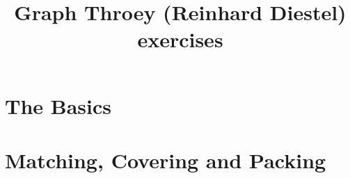 \documentclass{jarticle}
\title{Graph Throey (Reinhard Diestel) exercises}
\begin{document}
\maketitle

\section{The Basics}


















































\newpage

\section{Matching, Covering and Packing}






































\newpage
\end{document}
